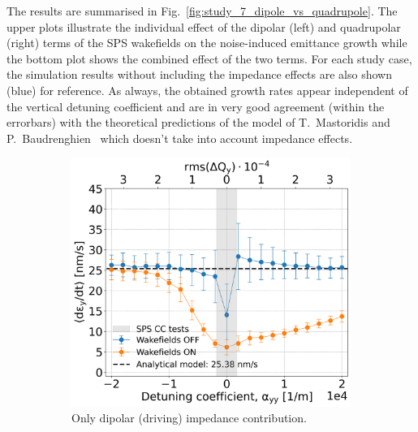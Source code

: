 The results are summarised in Fig.~\ref{fig:study_7_dipole_vs_quadrupole}. The upper plots illustrate the individual effect of the dipolar (left) and quadrupolar (right) terms of the SPS wakefields on the noise-induced emittance growth while the bottom plot shows the combined effect of the two terms. For each study case, the simulation results without including the impedance effects are also shown (blue) for reference. As always, the obtained growth rates appear independent of the vertical detuning coefficient and are in very good agreement (within the errorbars) with the theoretical predictions of the model of T.~Mastoridis and P.~Baudrenghien~\cite{PhysRevSTAB.18.101001} which doesn't take into account impedance effects.



\begin{figure}[htp]
    \centering
    \begin{subfigure}{.45\textwidth}
        \centering
        \includegraphics[width=.95\linewidth]{images/Ch7/dipolar_impedance.png}  
        \caption{Only dipolar (driving) impedance contribution.}
        \label{fig:study_7_dipole}
    \end{subfigure}
    \begin{subfigure}{.45\textwidth}
        \centering

\end{subfigure}
\end{figure}
